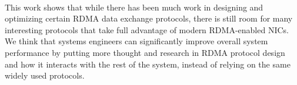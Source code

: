 \paragraph{} This work shows that while there has been much work in designing and optimizing certain RDMA data
exchange protocols, there is still room for many interesting protocols that take full advantage of modern RDMA-enabled NICs.
We think that systems engineers can significantly improve overall system performance by putting more thought and research in
RDMA protocol design and how it interacts with the rest of the system, instead of relying on the same widely used protocols.
